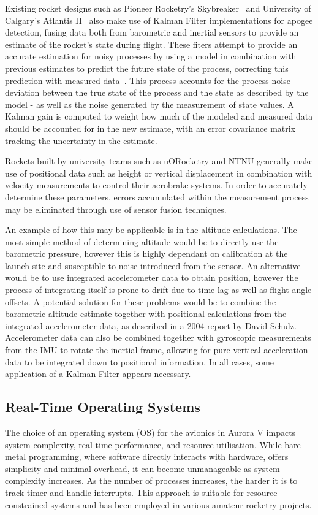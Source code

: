 Existing rocket designs such as Pioneer Rocketry's Skybreaker~\cite{Pioneer2016} and University of Calgary's Atlantis II~\cite{Atlantis2018} also make use of Kalman Filter implementations for apogee detection, fusing data both from barometric and inertial sensors to provide an estimate of the rocket's state during flight. These fiters attempt to provide an accurate estimation for noisy processes by using a model in combination with previous estimates to predict the future state of the process, correcting this prediction with measured data~\cite{Welch1995,kalman1960}. This process accounts for the process noise - deviation between the true state of the process and the state as described by the model - as well as the noise generated by the measurement of state values. A Kalman gain is computed to weight how much of the modeled and measured data should be accounted for in the new estimate, with an error covariance matrix tracking the uncertainty in the estimate.

Rockets built by university teams such as uORocketry and NTNU generally make use of positional data such as height or vertical displacement in combination with velocity measurements to control their aerobrake systems\cite{uORocketry, NTNU}. In order to accurately determine these parameters, errors accumulated within the measurement process may be eliminated through use of sensor fusion techniques. 

An example of how this may be applicable is in the altitude calculations. The most simple method of determining altitude would be to directly use the barometric pressure, however this is highly dependant on calibration at the launch site and susceptible to noise introduced from the sensor. An alternative would be to use integrated accelerometer data to obtain position, however the process of integrating itself is prone to drift due to time lag as well as flight angle offsets. A potential solution for these problems would be to combine the barometric altitude estimate together with positional calculations from the integrated accelerometer data, as described in a 2004 report by David Schulz\cite{kalman-apogee}. Accelerometer data can also be combined together with gyroscopic measurements from the IMU to rotate the inertial frame, allowing for pure vertical acceleration data to be integrated down to positional information. In all cases, some application of a Kalman Filter appears necessary.

\subsection{Real-Time Operating Systems}
The choice of an operating system (OS) for the avionics in Aurora V impacts system complexity, real-time performance, and resource utilisation. While bare-metal programming, where software directly interacts with hardware, offers simplicity and minimal overhead, it can become unmanageable as system complexity increases. As the number of processes increases, the harder it is to track timer and handle interrupts. This approach is suitable for resource constrained systems and has been employed in various amateur rocketry projects. 

